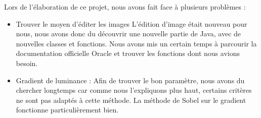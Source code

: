 \documentclass[12pt]{article}
\begin{document}
Lors de l'élaboration de ce projet, nous avons fait face à plusieurs problèmes :
\begin{itemize}
    \item Trouver le moyen d'éditer les images  \newline
    L'édition d'image était nouveau pour nous, nous avons donc du découvrir une nouvelle partie de Java, avec de nouvelles classes et fonctions. Nous avons mis un certain temps à parcourir la documentation officielle Oracle et trouver les fonctions dont nous avions besoin.

    \item Gradient de luminance : \newline
    Afin de trouver le bon paramètre, nous avons du chercher longtemps car comme nous l'expliquons plus haut, certains critères ne sont pas adaptés à cette méthode. La méthode de Sobel sur le gradient fonctionne particulièrement bien.


\end{itemize}
\end{document}
